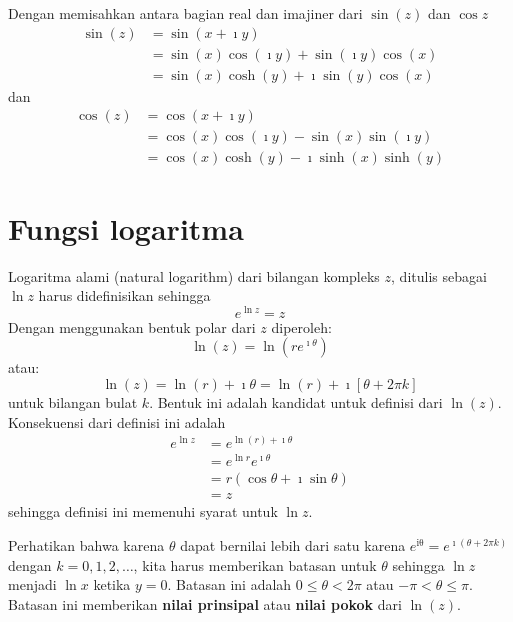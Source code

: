 Dengan memisahkan antara bagian real dan imajiner dari $\sin(z)$ dan
$\cos z$
\begin{align*}
\sin(z) & =\sin\left(x + \imath y\right) \\
 & = \sin(x) \cos(\imath y) + \sin(\imath y) \cos(x) \\
 & = \sin(x) \cosh(y) + \imath \sin(y)\cos(x)
\end{align*}
dan
\begin{align*}
\cos(z) & = \cos(x + \imath y) \\
 & = \cos(x)\cos(\imath y) - \sin(x) \sin(\imath y) \\
 & = \cos(x)\cosh(y) - \imath \sinh(x) \sinh(y)
\end{align*}



\section{Fungsi logaritma}

Logaritma alami (natural logarithm) dari bilangan kompleks $z$, ditulis
sebagai $\ln z$ harus didefinisikan sehingga
\[
e^{\ln z}=z
\]
Dengan menggunakan bentuk polar dari $z$ diperoleh:
\begin{equation}
\ln(z) = \ln \left(r e^{\imath \theta} \right)
\end{equation}
atau:
\begin{equation}
\ln(z) = \ln(r) + \imath \theta = \ln(r) + \imath\left[\theta + 2\pi k \right]
\label{eq:log-natural}
\end{equation}
untuk bilangan bulat $k$.
Bentuk ini adalah kandidat untuk definisi dari $\ln(z)$. Konsekuensi
dari definisi ini adalah
\begin{align*}
e^{\ln z} & =e^{\ln(r) + \imath \theta}\\
 & = e^{\ln r}e^{\imath \theta}\\
 & = r\left(\cos\theta+\imath \sin\theta\right)\\
 & = z
\end{align*}
sehingga definisi ini memenuhi syarat untuk $\ln z$.

Perhatikan bahwa karena $\theta$ dapat bernilai lebih dari satu karena
$e^{\mathrm{i\theta}} = e^{\imath (\theta + 2\pi k)}$ dengan $k=0,1,2,\ldots$,
kita harus memberikan batasan untuk $\theta$ sehingga $\ln z$
menjadi $\ln x$ ketika $y=0$. Batasan ini adalah $0\leq\theta<2\pi$
atau $-\pi < \theta \leq \pi$. Batasan ini memberikan \textbf{nilai prinsipal}
atau \textbf{nilai pokok} dari $\ln(z)$.


